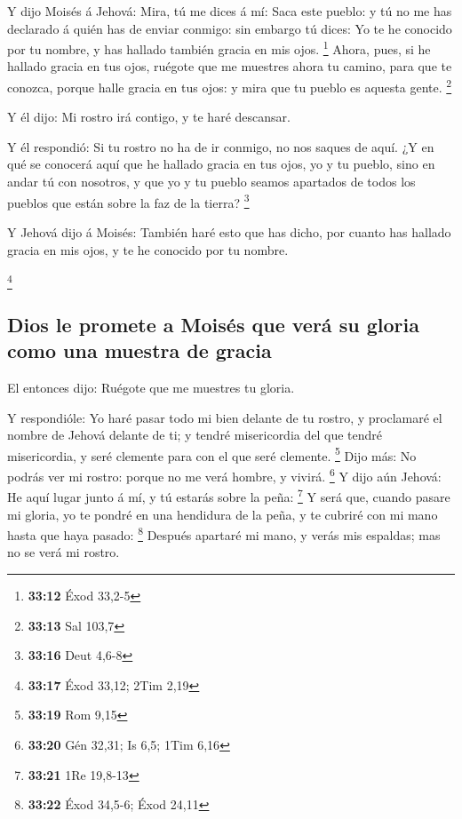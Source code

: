  Y dijo Moisés á Jehová: Mira, tú me dices á mí: Saca
este pueblo: y tú no me has declarado á quién has de enviar conmigo: sin
embargo tú dices: Yo te he conocido por tu nombre, y has hallado también
gracia en mis ojos. \footnote{\textbf{33:12} Éxod 33,2-5}
 Ahora, pues, si he hallado gracia en tus ojos, ruégote
que me muestres ahora tu camino, para que te conozca, porque halle
gracia en tus ojos: y mira que tu pueblo es aquesta gente. \footnote{\textbf{33:13}
  Sal 103,7}

 Y él dijo: Mi rostro irá contigo, y te haré descansar.

 Y él respondió: Si tu rostro no ha de ir conmigo, no nos
saques de aquí.  ¿Y en qué se conocerá aquí que he
hallado gracia en tus ojos, yo y tu pueblo, sino en andar tú con
nosotros, y que yo y tu pueblo seamos apartados de todos los pueblos que
están sobre la faz de la tierra? \footnote{\textbf{33:16} Deut 4,6-8}

 Y Jehová dijo á Moisés: También haré esto que has dicho,
por cuanto has hallado gracia en mis ojos, y te he conocido por tu
nombre.

\footnote{\textbf{33:17} Éxod 33,12; 2Tim 2,19}

\hypertarget{dios-le-promete-a-moisuxe9s-que-veruxe1-su-gloria-como-una-muestra-de-gracia}{%
\subsection{Dios le promete a Moisés que verá su gloria como una muestra
de
gracia}\label{dios-le-promete-a-moisuxe9s-que-veruxe1-su-gloria-como-una-muestra-de-gracia}}

 El entonces dijo: Ruégote que me muestres tu gloria.

 Y respondióle: Yo haré pasar todo mi bien delante de tu
rostro, y proclamaré el nombre de Jehová delante de ti; y tendré
misericordia del que tendré misericordia, y seré clemente para con el
que seré clemente. \footnote{\textbf{33:19} Rom 9,15} 
Dijo más: No podrás ver mi rostro: porque no me verá hombre, y vivirá.
\footnote{\textbf{33:20} Gén 32,31; Is 6,5; 1Tim 6,16}  Y
dijo aún Jehová: He aquí lugar junto á mí, y tú estarás sobre la peña:
\footnote{\textbf{33:21} 1Re 19,8-13}  Y será que, cuando
pasare mi gloria, yo te pondré en una hendidura de la peña, y te cubriré
con mi mano hasta que haya pasado: \footnote{\textbf{33:22} Éxod 34,5-6;
  Éxod 24,11}  Después apartaré mi mano, y verás mis
espaldas; mas no se verá mi rostro.

